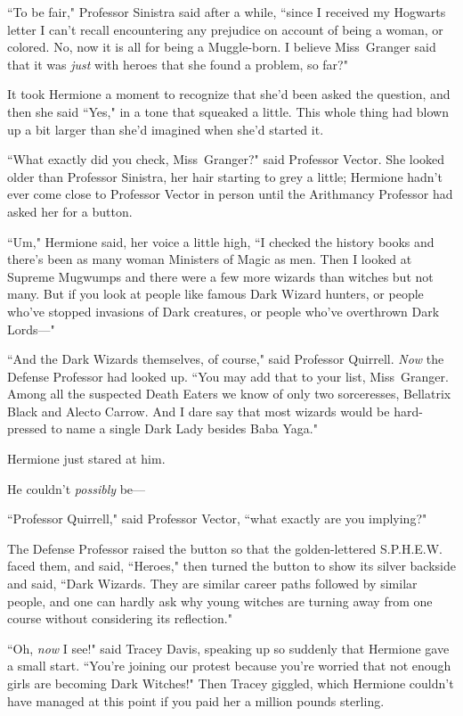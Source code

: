``To be fair," Professor Sinistra said after a while, ``since I received my Hogwarts letter I can't recall encountering any prejudice on account of being a woman, or colored. No, now it is all for being a Muggle-born. I believe Miss~Granger said that it was \emph{just} with heroes that she found a problem, so far?"

It took Hermione a moment to recognize that she'd been asked the question, and then she said ``Yes," in a tone that squeaked a little. This whole thing had blown up a bit larger than she'd imagined when she'd started it.

``What exactly did you check, Miss~Granger?" said Professor Vector. She looked older than Professor Sinistra, her hair starting to grey a little; Hermione hadn't ever come close to Professor Vector in person until the Arithmancy Professor had asked her for a button.

``Um," Hermione said, her voice a little high, ``I checked the history books and there's been as many woman Ministers of Magic as men. Then I looked at Supreme Mugwumps and there were a few more wizards than witches but not many. But if you look at people like famous Dark Wizard hunters, or people who've stopped invasions of Dark creatures, or people who've overthrown Dark Lords---"

``And the Dark Wizards themselves, of course," said Professor Quirrell. \emph{Now} the Defense Professor had looked up. ``You may add that to your list, Miss~Granger. Among all the suspected Death Eaters we know of only two sorceresses, Bellatrix Black and Alecto Carrow. And I dare say that most wizards would be hard-pressed to name a single Dark Lady besides Baba Yaga."

Hermione just stared at him.

He couldn't \emph{possibly} be---

``Professor Quirrell," said Professor Vector, ``what exactly are you implying?"

The Defense Professor raised the button so that the golden-lettered S.P.H.E.W. faced them, and said, ``Heroes," then turned the button to show its silver backside and said, ``Dark Wizards. They are similar career paths followed by similar people, and one can hardly ask why young witches are turning away from one course without considering its reflection."

``Oh, \emph{now} I see!" said Tracey Davis, speaking up so suddenly that Hermione gave a small start. ``You're joining our protest because you're worried that not enough girls are becoming Dark Witches!" Then Tracey giggled, which Hermione couldn't have managed at this point if you paid her a million pounds sterling.

